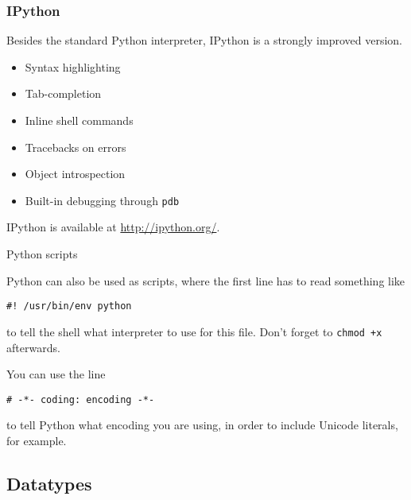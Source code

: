 \documentclass[xetex,10pt]{beamer}
\def\spacer{\vspace*{1em}}
\begin{document}
\begin{frame}[fragile]
	\frametitle{IPython}
	
	Besides the standard Python interpreter, IPython is a strongly improved version.

	\spacer

	\begin{itemize}
		\item Syntax highlighting
		\item Tab-completion
		\item Inline shell commands
		\item Tracebacks on errors
		\item Object introspection
		\item Built-in debugging through \verb!pdb!
	\end{itemize}
	
	\spacer
	IPython is available at \url{http://ipython.org/}.
	
\end{frame}

\begin{frame}[fragile]{Python scripts}
	
	Python can also be used as scripts, where the first line has to read something like
	
\begin{verbatim}
#! /usr/bin/env python
\end{verbatim}
	
	to tell the shell what interpreter to use for this file. Don't forget to \verb!chmod +x! afterwards.\\

	\pause
	\spacer

	You can use the line

\begin{verbatim}
# -*- coding: encoding -*-
\end{verbatim}

	to tell Python what encoding you are using, in order to include Unicode literals, for example.

\end{frame}

\subsection{Datatypes}
\end{document}
